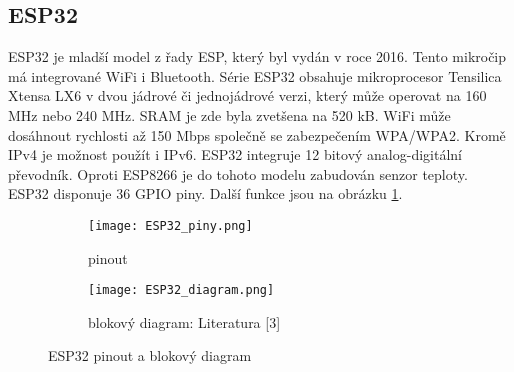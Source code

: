 \documentclass[a4paper, 12pt]{report}
\begin{document}
			\subsection{ESP32}
				ESP32 je mladší model z řady ESP, který byl vydán v roce 2016. Tento mikročip má integrované WiFi i Bluetooth. Série ESP32 obsahuje mikroprocesor Tensilica Xtensa LX6 v dvou jádrové či jednojádrové verzi, který může operovat na 160 \si{MHz} nebo 240 \si{MHz}. SRAM je zde byla zvetšena na 520 \si{kB}. WiFi může dosáhnout rychlosti až 150 \si{Mbps} společně se zabezpečením WPA/WPA2. Kromě IPv4 je možnost použít i IPv6. ESP32 integruje 12 bitový analog-digitální převodník. Oproti ESP8266 je do tohoto modelu zabudován senzor teploty. ESP32 disponuje 36 GPIO piny. Další funkce jsou na obrázku \ref{ESP32_diagram_pinout}. \\

					\begin{figure}[h!]
					  \centering
					  \begin{subfigure}[b]{0.4\linewidth}
					    \texttt{[image: ESP32\_piny.png]}
					    \caption{pinout}
					  \end{subfigure}
					  \begin{subfigure}[b]{0.4\linewidth}
					    \texttt{[image: ESP32\_diagram.png]}
					    \caption{blokový diagram: Literatura [3]}
					  \end{subfigure}
					  \caption{ESP32 pinout a blokový diagram}
					  \label{ESP32_diagram_pinout}
					\end{figure}
\end{document}
